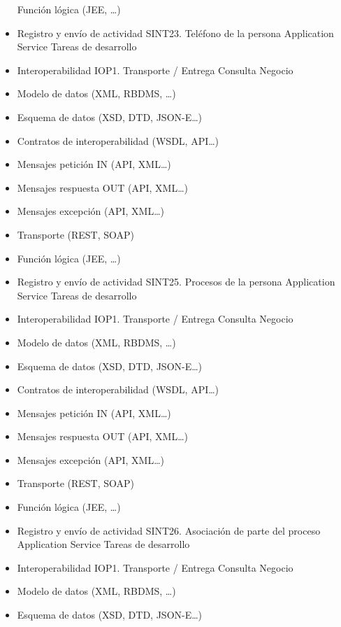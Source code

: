 \documentclass[
  paper=a4,
  ,captions=tableheading
]{scrartcl}
\begin{document}
\begin{itemize}
  Función lógica (JEE, \ldots)
\item
  Registro y envío de actividad \textbar{} \textbar{} SINT23. Teléfono
  de la persona \textbar{} Application Service \textbar{} Tareas de
  desarrollo
\item
  Interoperabilidad IOP1. Transporte / Entrega Consulta Negocio\\
\item
  Modelo de datos (XML, RBDMS, \ldots)
\item
  Esquema de datos (XSD, DTD, JSON-E\ldots)
\item
  Contratos de interoperabilidad (WSDL, API\ldots)
\item
  Mensajes petición IN (API, XML\ldots)
\item
  Mensajes respuesta OUT (API, XML\ldots)
\item
  Mensajes excepción (API, XML\ldots)
\item
  Transporte (REST, SOAP)
\item
  Función lógica (JEE, \ldots)
\item
  Registro y envío de actividad \textbar{} \textbar{} SINT25. Procesos
  de la persona \textbar{} Application Service \textbar{} Tareas de
  desarrollo
\item
  Interoperabilidad IOP1. Transporte / Entrega Consulta Negocio\\
\item
  Modelo de datos (XML, RBDMS, \ldots)
\item
  Esquema de datos (XSD, DTD, JSON-E\ldots)
\item
  Contratos de interoperabilidad (WSDL, API\ldots)
\item
  Mensajes petición IN (API, XML\ldots)
\item
  Mensajes respuesta OUT (API, XML\ldots)
\item
  Mensajes excepción (API, XML\ldots)
\item
  Transporte (REST, SOAP)
\item
  Función lógica (JEE, \ldots)
\item
  Registro y envío de actividad \textbar{} \textbar{} SINT26. Asociación
  de parte del proceso \textbar{} Application Service \textbar{} Tareas
  de desarrollo
\item
  Interoperabilidad IOP1. Transporte / Entrega Consulta Negocio\\
\item
  Modelo de datos (XML, RBDMS, \ldots)
\item
  Esquema de datos (XSD, DTD, JSON-E\ldots)

\end{itemize}
\end{document}
